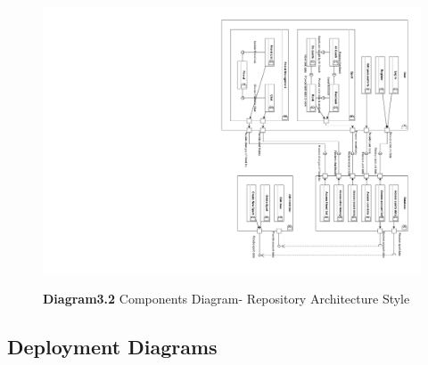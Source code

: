 \documentclass[a4paper]{article}
\begin{document}
	\begin{figure}[H]
		\centering
		\caption*{\textbf{Diagram3.2} Components Diagram- Repository Architecture Style}
		\includegraphics[width=1\textwidth]{images/ComponentsDiagram_Repository.pdf}
		\label{CD_RA}
	\end{figure}

	\subsection{Deployment Diagrams}
\end{document}
